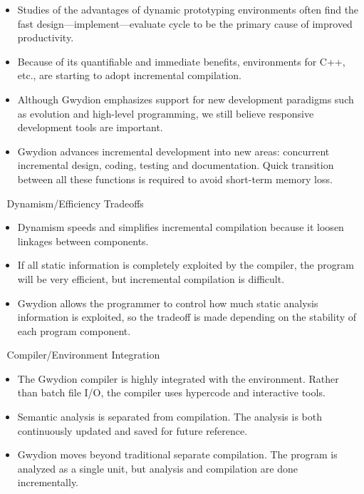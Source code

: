 \begin{itemize}
\item Studies of the advantages of dynamic prototyping environments often
find the fast design---implement---evaluate cycle to be the primary cause of
improved productivity.

\item Because of its quantifiable and immediate benefits, environments for
C++, etc., are starting to adopt incremental compilation.

\item Although Gwydion emphasizes support for new development paradigms such
as evolution and high-level programming, we still believe responsive
development tools are important.

\item Gwydion advances incremental development into new areas: concurrent
incremental design, coding, testing and documentation.  Quick transition
between all these functions is required to avoid short-term memory loss.
\end{itemize}


\newpage
Dynamism/Efficiency Tradeoffs

\begin{itemize}
\item Dynamism speeds and simplifies incremental compilation because it loosen
linkages between components.

\item If all static information is completely exploited by the compiler, the
program will be very efficient, but incremental compilation is difficult.

\item Gwydion allows the programmer to control how much static analysis
information is exploited, so the tradeoff is made depending on the stability of
each program component.
\end{itemize}


\newpage
Compiler/Environment Integration

\begin{itemize}
\item The Gwydion compiler is highly integrated with the environment.  Rather
than batch file I/O, the compiler uses hypercode and interactive tools.

\item Semantic analysis is separated from compilation.  The analysis is both
continuously updated and saved for future reference.

\item Gwydion moves beyond traditional separate compilation.  The program is
analyzed as a single unit, but analysis and compilation are done incrementally.
\end{itemize}

